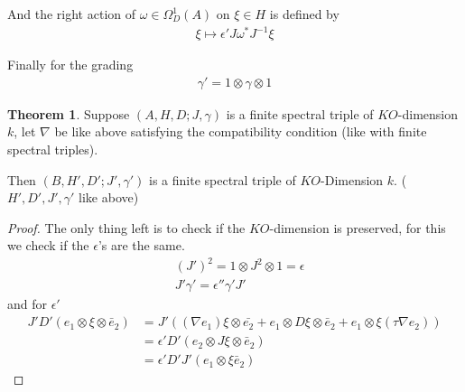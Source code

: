\documentclass[a4paper]{article}
\theoremstyle{definition}
\theoremstyle{definition}
\theoremstyle{definition}
\theoremstyle{theorem}
\newtheorem{theorem}{Theorem}
\theoremstyle{theorem}
\begin{document}
And the right action of $\omega \in \Omega _D ^1(A)$ on $\xi \in H$ is
defined by
\begin{align}
    \xi \mapsto \epsilon' J \omega ^* J^{-1}\xi
\end{align}

Finally for the grading
\begin{align}
    \gamma ' = 1 \otimes \gamma \otimes 1
\end{align}

\begin{theorem}
    Suppose $(A, H, D; J, \gamma)$ is a finite spectral triple of
    $KO$-dimension $k$, let $\nabla$ be like above satisfying the
    compatibility condition (like with finite spectral triples).

    Then $(B, H',D'; J', \gamma')$ is a finite spectral triple of
    $KO$-Dimension $k$. ($H', D', J', \gamma'$ like above)
\end{theorem}

\begin{proof}
    The only thing left is to check if the $KO$-dimension is preserved,
    for this we check if the $\epsilon$'s are the same.
    \begin{align}
        &(J')^2 = 1 \otimes J^2 \otimes 1 = \epsilon\\
        &J' \gamma '= \epsilon ''\gamma'J'
    \end{align}
    and for $\epsilon '$
    \begin{align}
        J'D'(e_1 \otimes \xi \otimes \bar{e}_2)&=J'((\nabla e_1) \xi \otimes
        \bar{e_2} + e_1 \otimes D\xi \otimes \bar{e}_2 + e_1 \otimes \xi (\tau
        \nabla e_2))\\
        &= \epsilon' D'(e_2 \otimes J\xi \otimes \bar{e}_2)\\
        &= \epsilon' D'J'(e_1 \otimes \xi \bar{e}_2)
    \end{align}
\end{proof}
\end{document}
